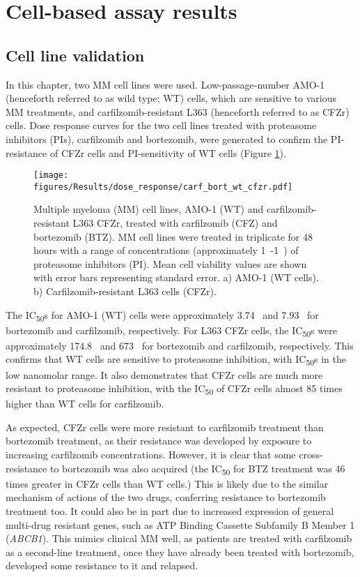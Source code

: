 \section{Cell-based assay results}
\subsection{Cell line validation}
In this chapter, two MM cell lines were used.
Low-passage-number AMO-1 (henceforth referred to as wild type; WT) cells, which are sensitive to various MM treatments, and carfilzomib-resistant L363 (henceforth referred to as CFZr) cells.
Dose response curves for the two cell lines treated with proteasome inhibitors (PIs), carfilzomib and bortezomib, were generated to confirm the PI-resistance of CFZr cells and PI-sensitivity of WT cells (Figure \ref{fig:dose_carf_bort}).
\begin{figure}[h]
\centering
\texttt{[image: figures/Results/dose\_response/carf\_bort\_wt\_cfzr.pdf]}
\caption[Carfilzomib and bortezomib dose response curves]{Multiple myeloma (MM) cell lines, AMO-1 (WT) and carfilzomib-resistant L363 CFZr, treated with carfilzomib (CFZ) and bortezomib (BTZ).
MM cell lines were treated in triplicate for 48 hours with a range of concentrations (approximately 1\si{\nano\Molar}-1\si{\micro\Molar}) of proteasome inhibitors (PI).
Mean cell viability values are shown with error bars representing standard error.
a) AMO-1 (WT cells).
b) Carfilzomib-resistant L363 cells (CFZr).}
\label{fig:dose_carf_bort}
\end{figure}
The IC\textsubscript{50}s for AMO-1 (WT) cells were approximately 3.74\si{\nano\Molar} and 7.93\si{\nano\Molar} for bortezomib and carfilzomib, respectively.
For L363 CFZr cells, the IC\textsubscript{50}s were approximately 174.8\si{\nano\Molar} and 673\si{\nano\Molar} for bortezomib and carfilzomib, respectively.
This confirms that WT cells are sensitive to proteasome inhibition, with IC\textsubscript{50}s in the low nanomolar range.
It also demonstrates that CFZr cells are much more resistant to proteasome inhibition, with the IC\textsubscript{50} of CFZr cells almost 85 times higher than WT cells for carfilzomib.

As expected, CFZr cells were more resistant to carfilzomib treatment than bortezomib treatment, as their resistance was developed by exposure to increasing carfilzomib concentrations.
However, it is clear that some cross-resistance to bortezomib was also acquired (the IC\textsubscript{50} for BTZ treatment was 46 times greater in CFZr cells than WT cells.)
This is likely due to the similar mechanism of actions of the two drugs, conferring resistance to bortezomib treatment too.
It could also be in part due to increased expression of general multi-drug resistant genes, such as ATP Binding Cassette Subfamily B Member 1 (\textit{ABCB1}).
This mimics clinical MM well, as patients are treated with carfilzomib as a second-line treatment, once they have already been treated with bortezomib, developed some resistance to it and relapsed.

